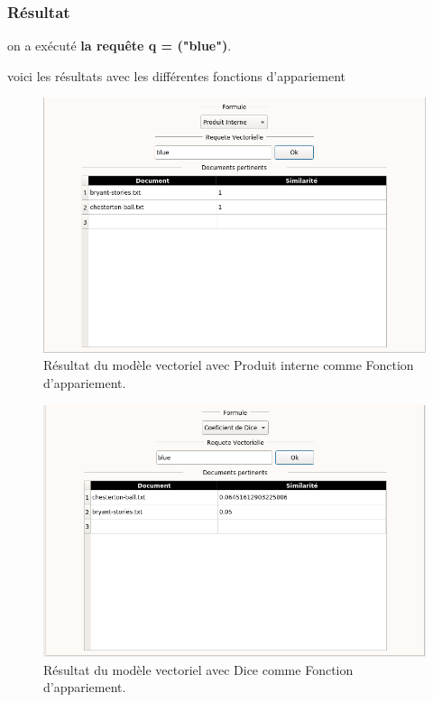 \documentclass[12pt,a4paper,oneside]{article}
\begin{document}
\subsubsection*{Résultat}
on a exécuté \textbf{la requête q = ("blue")}.

voici les résultats avec les différentes fonctions d'appariement
\begin{figure}[H]
	\centering
	\includegraphics[scale=0.4]{images/produitinterne.png}
	\caption{Résultat du modèle vectoriel avec Produit interne comme Fonction d'appariement.}
\end{figure}
\begin{figure}[H]
	\centering
	\includegraphics[scale=0.4]{images/dice.png}
	\caption{Résultat du modèle vectoriel avec Dice comme Fonction d'appariement.}
\end{figure}
\end{document}
